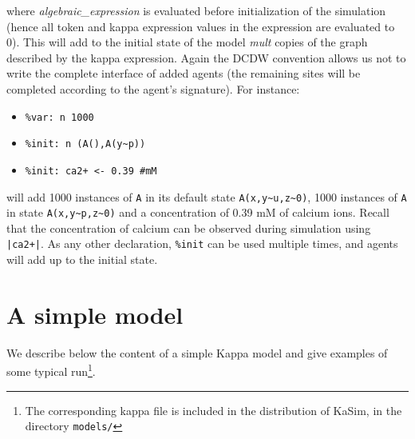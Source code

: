 \documentclass[11pt]{book}
\def\KaSim{\textsf{KaSim}}
\def\int{\hbox{\texttt{\~}}}
\def\ttt#1{\texttt{#1}}
\def\ITE#1{\begin{itemize}#1\end{itemize}}
\begin{document}
where \textit{algebraic\_expression} is evaluated before initialization of the simulation (hence all token and kappa expression values in the expression are evaluated to 0). This will add to the initial state of the model \textit{mult} copies of the graph described by the kappa expression. Again the DCDW convention allows us not to write the complete interface of added agents (the remaining sites will be completed according to the agent's signature). For instance:
\ITE{
\item[] \ttt{\%var: \textquotesingle n\textquotesingle~1000}
\item[] \ttt{\%init: \textquotesingle n\textquotesingle~(A(),A(y\int p))}
\item[] \ttt{\%init: ca2+ <- 0.39 \#mM}
}
will add 1000 instances of \ttt{A} in its default state \ttt{A(x,y\int u,z\int 0)}, 1000 instances of \ttt{A} in state \ttt{A(x,y\int p,z\int 0)} and a concentration of 0.39 mM of calcium ions. Recall that the concentration of calcium can be observed during simulation using \ttt{|ca2+|}.
As any other declaration, \ttt{\%init} can be used multiple times, and agents will add up to the initial state.

\chapter{A simple model}\label{chap:abc}

We describe below the content of a simple Kappa model and give examples of some typical run\footnote{The corresponding kappa file is included in the distribution of \KaSim, in the directory \ttt{models/}}.
\end{document}
